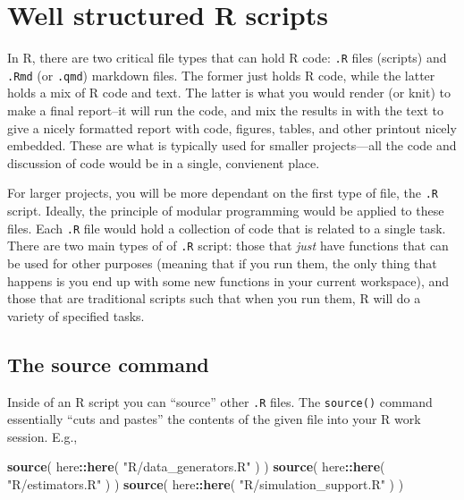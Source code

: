 \documentclass[
]{book}
\newenvironment{Shaded}{\begin{snugshade}}{\end{snugshade}}
\newcommand{\FunctionTok}[1]{\textcolor[rgb]{0.13,0.29,0.53}{\textbf{#1}}}
\newcommand{\NormalTok}[1]{#1}
\newcommand{\SpecialCharTok}[1]{\textcolor[rgb]{0.81,0.36,0.00}{\textbf{#1}}}
\newcommand{\StringTok}[1]{\textcolor[rgb]{0.31,0.60,0.02}{#1}}
\begin{document}
\section{Well structured R scripts}\label{well-structured-r-scripts}

In R, there are two critical file types that can hold R code: \texttt{.R} files (scripts) and \texttt{.Rmd} (or \texttt{.qmd}) markdown files.
The former just holds R code, while the latter holds a mix of R code and text.
The latter is what you would render (or knit) to make a final report--it will run the code, and mix the results in with the text to give a nicely formatted report with code, figures, tables, and other printout nicely embedded.
These are what is typically used for smaller projects---all the code and discussion of code would be in a single, convienent place.

For larger projects, you will be more dependant on the first type of file, the \texttt{.R} script.
Ideally, the principle of modular programming would be applied to these files.
Each \texttt{.R} file would hold a collection of code that is related to a single task.
There are two main types of of \texttt{.R} script: those that \emph{just} have functions that can be used for other purposes (meaning that if you run them, the only thing that happens is you end up with some new functions in your current workspace), and those that are traditional scripts such that when you run them, R will do a variety of specified tasks.

\subsection{The source command}\label{about-source-command}

Inside of an R script you can ``source'' other \texttt{.R} files.
The \texttt{source()} command essentially ``cuts and pastes'' the contents of the given file into your R work session.
E.g.,

\begin{Shaded}
\begin{Highlighting}[]
\FunctionTok{source}\NormalTok{( here}\SpecialCharTok{::}\FunctionTok{here}\NormalTok{( }\StringTok{"R/data\_generators.R"}\NormalTok{ ) )}
\FunctionTok{source}\NormalTok{( here}\SpecialCharTok{::}\FunctionTok{here}\NormalTok{( }\StringTok{"R/estimators.R"}\NormalTok{ ) )}
\FunctionTok{source}\NormalTok{( here}\SpecialCharTok{::}\FunctionTok{here}\NormalTok{( }\StringTok{"R/simulation\_support.R"}\NormalTok{ ) )}
\end{Highlighting}
\end{Shaded}
\end{document}

